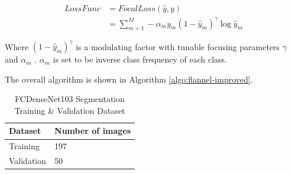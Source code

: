 \documentclass{sigkddExp}
\begin{document}
\begin{align}
    LossFunc & =FocalLoss(\hat{y},y)                                               \\
             & =\sum_{m=1}^{M} - \alpha_m y_m (1-\hat{y}_m)^\gamma \log{\hat{y}_m}
    \label{eq:loss}
\end{align}

Where $(1-\hat{y}_m)^\gamma$ is a modulating factor with tunable focusing
parameters $\gamma$ and $\alpha_m$ \cite{10.1093/jamia/ocaa280}. $\alpha_m$
is set to be inverse class frequency of each class.

The overall algorithm is shown in Algorithm \ref{algo:flannel-improved}.

\begin{table}[h]
    \caption{FC\-DenseNet103 Segmentation Training \& Validation Dataset}
    \label{table:segdata}
    \begin{tabular}{ll} \hline
        Dataset    & Number of images \\ \hline
        Training   & 197              \\
        Validation & 50               \\
        \hline
    \end{tabular}

\end{table}
\end{document}

